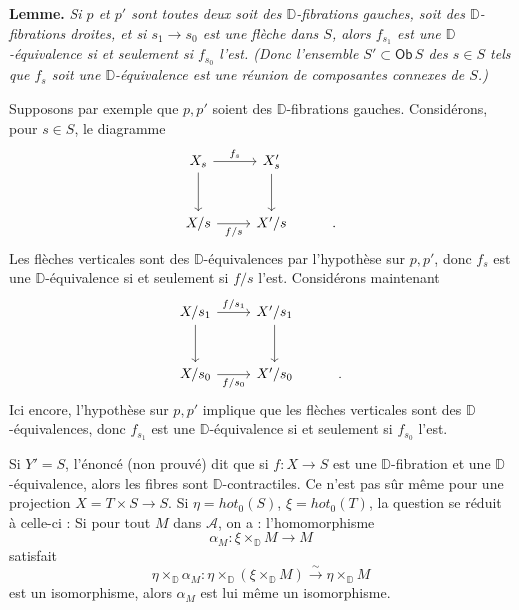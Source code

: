 \documentclass[11pt]{article}
\newcommand{\printedpage}[1]{\marginpar{\footnotesize p.~#1}}
\newcommand{\msp}[1]{\marginpar{\footnotesize [#1]}}
\newcommand{\DD}{\mathbb{D}}
\newcommand{\Ob}{\mathsf{Ob}}
\begin{document}
\textbf{Lemme.} \textit{Si $p$ et $p'$ sont toutes deux soit des $\DD$-fibrations gauches, soit des $\DD$-fibrations droites, et si $s_1 \to s_0$ est une flèche dans $S$, alors $f_{s_1}$ est une $\DD$-équivalence si et seulement si $f_{s_0}$ l'est. (Donc l'ensemble $S' \subset \Ob\, S$ des $s \in S$ tels que $f_s$ soit une $\DD$-équivalence est une réunion de composantes connexes de $S$.)}

\indent Supposons par exemple que $p,p'$ soient des $\DD$-fibrations gauches. Considérons, pour $s \in S$, le diagramme
\[
\begin{tikzcd}[row sep=large]
X_s \arrow[r, "f_s"] \arrow[d] & X'_s \arrow[d] \\
X/s \arrow[r, "f/s"'] & X'/s & .
\end{tikzcd}
\]
Les flèches verticales sont des $\DD$-équivalences par l'hypothèse sur $p,p'$, donc $f_s$ est une $\DD$-équivalence si et seulement si $f/s$ l'est. Considérons maintenant
\[
\begin{tikzcd}[row sep=large]
X/s_1 \arrow[r, "f/s_1"] \arrow[d] & X'/s_1 \arrow[d] \\
X/s_0 \arrow[r, "f/s_0"'] & X'/s_0 & .
\end{tikzcd}
\]
Ici encore, l'hypothèse sur $p,p'$ implique que les flèches verticales sont des $\DD$-équivalences, donc $f_{s_1}$ est une $\DD$-équivalence si et seulement si $f_{s_0}$ l'est.

\msp{page 86}

Si $Y' = S$, l'énoncé (non prouvé) dit que si $f : X \to S$ est une $\DD$-fibration et une $\DD$-équivalence, alors les fibres sont $\DD$-contractiles. Ce n'est pas sûr même pour une projection $X = T \times S \to S$. Si $\eta = \mathit{hot}_0(S)$, $\xi = \mathit{hot}_0(T)$, la question se réduit à celle-ci : Si pour tout $M$ dans $\mathcal{A}$, on a : l'homomorphisme
\[
\alpha_M : \xi \times_{\DD} M \longrightarrow M
\]
\printedpage{53}
satisfait
\[
\eta \times_{\DD} \alpha_M : \eta \times_{\DD} (\xi \times_{\DD} M) \xrightarrow{\sim} \eta \times_{\DD} M
\]
est un isomorphisme, alors $\alpha_M$ est lui même un isomorphisme.

\msp{page 87}
\end{document}
